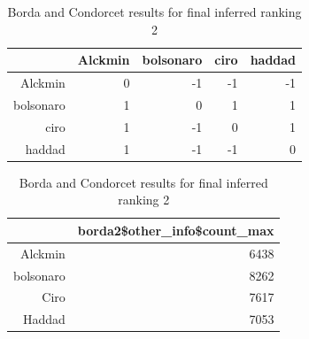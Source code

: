 \documentclass[hidelinks,11pt]{article}
\begin{document}
\begin{table}[H]
  \begin{subtable}[h]{0.4\textwidth}
    \centering
\begin{tabular}{rrrrr}
  \hline
 & Alckmin & bolsonaro & ciro & haddad \\
  \hline
Alckmin & 0 & -1 & -1 & -1 \\
  bolsonaro & 1 & 0 & 1 & 1 \\
  ciro & 1 & -1 & 0 & 1 \\
  haddad & 1 & -1 & -1 & 0 \\
   \hline
\end{tabular}
\caption{Pairwise Majority Comparisons }
\end{subtable}
\hfill
\begin{subtable}[h]{0.4\textwidth}
\centering
\begin{tabular}{rr}
  \hline
 & borda2\$other\_info\$count\_max \\
  \hline
Alckmin & 6438 \\
  bolsonaro & 8262 \\
  Ciro & 7617 \\
  Haddad & 7053 \\
   \hline
\end{tabular}
\caption{Borda scores}
\end{subtable}
\caption{Borda and Condorcet results for final inferred ranking 2}
\end{table}
\end{document}
